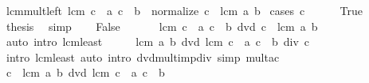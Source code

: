 \begin{isabellebody}
\ lcm{\isacharunderscore}{\kern0pt}mult{\isacharunderscore}{\kern0pt}left{\isacharcolon}{\kern0pt}\ {\isachardoublequoteopen}lcm\ {\isacharparenleft}{\kern0pt}c\ {\isacharasterisk}{\kern0pt}\ a{\isacharparenright}{\kern0pt}\ {\isacharparenleft}{\kern0pt}c\ {\isacharasterisk}{\kern0pt}\ b{\isacharparenright}{\kern0pt}\ {\isacharequal}{\kern0pt}\ normalize\ {\isacharparenleft}{\kern0pt}c\ {\isacharasterisk}{\kern0pt}\ lcm\ a\ b{\isacharparenright}{\kern0pt}{\isachardoublequoteclose}\isanewline
%
\isadelimproof
%
\endisadelimproof
%
\isatagproof
{}\isamarkupfalse%
\ {\isacharparenleft}{\kern0pt}cases\ {\isachardoublequoteopen}c\ {\isacharequal}{\kern0pt}\ {}{\isachardoublequoteclose}{\isacharparenright}{\kern0pt}\isanewline
\ \ \isamarkupfalse%
\ True\isanewline
\ \ \isamarkupfalse%
\ \isamarkupfalse%
\ {\isacharquery}{\kern0pt}thesis\ \isamarkupfalse%
\ simp\isanewline
{}\isamarkupfalse%
\isanewline
\ \ \isamarkupfalse%
\ False\isanewline
\ \ \isamarkupfalse%
\ \isamarkupfalse%
\ {\isacharasterisk}{\kern0pt}{\isacharcolon}{\kern0pt}\ {\isachardoublequoteopen}lcm\ {\isacharparenleft}{\kern0pt}c\ {\isacharasterisk}{\kern0pt}\ a{\isacharparenright}{\kern0pt}\ {\isacharparenleft}{\kern0pt}c\ {\isacharasterisk}{\kern0pt}\ b{\isacharparenright}{\kern0pt}\ dvd\ c\ {\isacharasterisk}{\kern0pt}\ lcm\ a\ b{\isachardoublequoteclose}\isanewline
\ \ \ \ \isamarkupfalse%
\ {\isacharparenleft}{\kern0pt}auto\ intro{\isacharcolon}{\kern0pt}\ lcm{\isacharunderscore}{\kern0pt}least{\isacharparenright}{\kern0pt}\isanewline
\ \ \isamarkupfalse%
\ \isamarkupfalse%
\ {\isachardoublequoteopen}lcm\ a\ b\ dvd\ lcm\ {\isacharparenleft}{\kern0pt}c\ {\isacharasterisk}{\kern0pt}\ a{\isacharparenright}{\kern0pt}\ {\isacharparenleft}{\kern0pt}c\ {\isacharasterisk}{\kern0pt}\ b{\isacharparenright}{\kern0pt}\ div\ c{\isachardoublequoteclose}\isanewline
\ \ \ \ \isamarkupfalse%
\ {\isacharparenleft}{\kern0pt}intro\ lcm{\isacharunderscore}{\kern0pt}least{\isacharparenright}{\kern0pt}\ {\isacharparenleft}{\kern0pt}auto\ intro{\isacharbang}{\kern0pt}{\isacharcolon}{\kern0pt}\ dvd{\isacharunderscore}{\kern0pt}mult{\isacharunderscore}{\kern0pt}imp{\isacharunderscore}{\kern0pt}div\ simp{\isacharcolon}{\kern0pt}\ mult{\isacharunderscore}{\kern0pt}ac{\isacharparenright}{\kern0pt}\isanewline
\ \ \isamarkupfalse%
\ {\isachardoublequoteopen}c\ {\isacharasterisk}{\kern0pt}\ lcm\ a\ b\ dvd\ lcm\ {\isacharparenleft}{\kern0pt}c\ {\isacharasterisk}{\kern0pt}\ a{\isacharparenright}{\kern0pt}\ {\isacharparenleft}{\kern0pt}c\ {\isacharasterisk}{\kern0pt}\ b{\isacharparenright}{\kern0pt}{\isachardoublequoteclose}\isanewline

\end{isabellebody}
